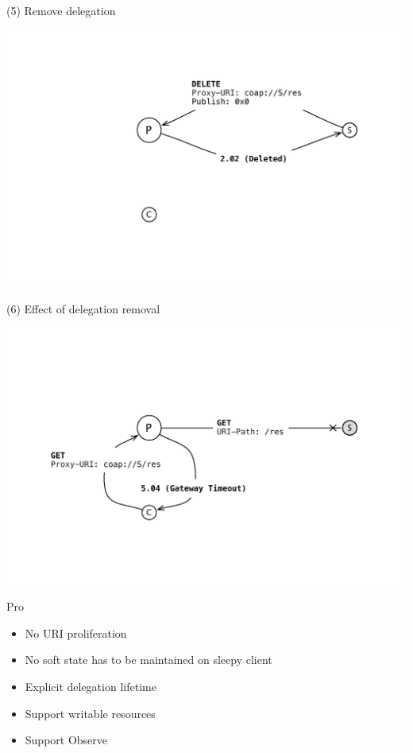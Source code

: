 \documentclass{beamer}
\begin{document}
\begin{frame}{(5) Remove delegation}
 \begin{center}
  \includegraphics[width=\textwidth]{../../share/images/publish4.pdf}
 \end{center}
\end{frame}

\begin{frame}{(6) Effect of delegation removal}
 \begin{center}
  \includegraphics[width=\textwidth]{../../share/images/publish5.pdf}
 \end{center}
\end{frame}

\begin{frame}{Pro}

\begin{itemize}
 \item No URI proliferation %
 \item No soft state has to be maintained on sleepy client
 \item Explicit delegation lifetime
 \item Support writable resources
 \item Support Observe
\end{itemize}
\end{frame}
\end{document}
